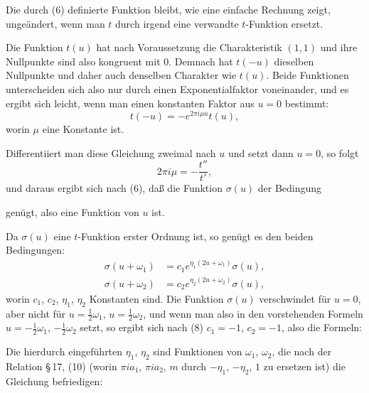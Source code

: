 
Die durch (6) definierte Funktion bleibt, wie eine einfache Rechnung zeigt, ungeändert, wenn man $t$ durch irgend eine verwandte $t$-Funktion ersetzt.

Die Funktion $t(u)$ hat nach Voraussetzung die Charakteristik $(1,1)$ und ihre Nullpunkte sind also kongruent mit 0. Demnach hat $t(-u)$ dieselben Nullpunkte und daher auch denselben Charakter wie $t(u)$. Beide Funktionen unterscheiden sich also nur durch einen Exponentialfaktor voneinander, und es ergibt sich leicht, wenn man einen konstanten Faktor aus $u = 0$ bestimmt:
\[
t(-u) = -e^{2\pi i \mu u} t(u),
\]
worin $\mu$ eine Konstante ist.

Differentiiert man diese Gleichung zweimal nach $u$ und setzt dann $u = 0$, so folgt
\[
2\pi i \mu = -\frac{t''}{t'},
\]
und daraus ergibt sich nach (6), daß die Funktion $\sigma(u)$ der Bedingung

genügt, also eine  Funktion von $u$ ist.

Da $\sigma(u)$ eine $t$-Funktion erster Ordnung ist, so genügt es den beiden Bedingungen:
\[
\begin{aligned}
\sigma(u+\omega_1) &= c_1 e^{\eta_1(2u+\omega_1)} \sigma(u),\\
\sigma(u+\omega_2) &= c_2 e^{\eta_2(2u+\omega_2)} \sigma(u),
\end{aligned}
\]
worin $c_1$, $c_2$, $\eta_1$, $\eta_2$ Konstanten sind. Die Funktion $\sigma(u)$ verschwindet für $u = 0$, aber nicht für $u = \frac{1}{2}\omega_1$, $u = \frac{1}{2}\omega_2$, und wenn man also in den vorstehenden Formeln $u = -\frac{1}{2}\omega_1$, $-\frac{1}{2}\omega_2$ setzt, so ergibt sich nach (8) $c_1 = -1$, $c_2 = -1$, also die Formeln:

Die hierdurch eingeführten $\eta_1$, $\eta_2$ sind Funktionen von $\omega_1$, $\omega_2$, die nach der Relation \S\,17, (10) (worin $\pi i a_1$, $\pi i a_2$, $m$ durch $-\eta_1$, $-\eta_2$, $1$ zu ersetzen ist) die Gleichung befriedigen:

